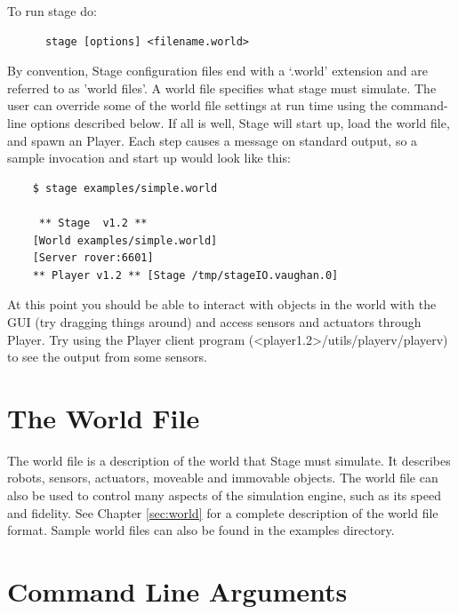 \documentclass[11pt,twoside]{report}
\begin{document}
    To run stage do: 
      \begin{verbatim} 
      stage [options] <filename.world> 
      \end{verbatim} 

    By convention, Stage configuration files end with a `.world'
    extension and are referred to as 'world files'. A world file
    specifies what stage must simulate. The user can override some of
    the world file settings at run time using the command-line options
    described below. If all is well, Stage will start up, load the
    world file, and spawn an Player. Each step causes a message on
    standard output, so a sample invocation and start up would look
    like this:

	\begin{verbatim} 
	$ stage examples/simple.world

	 ** Stage  v1.2 ** 
	[World examples/simple.world]
	[Server rover:6601]
	** Player v1.2 ** [Stage /tmp/stageIO.vaughan.0]
      \end{verbatim}

    At this point you should be able to interact with objects in the
    world with the GUI (try dragging things around) and access sensors
    and actuators through Player. Try using the Player client program
    (<player1.2>/utils/playerv/playerv) to see the output from some
    sensors.

  
  \section{The World File}

    The world file is a description of the world that Stage
    must simulate.  It describes robots, sensors, actuators,
    moveable and immovable objects.  The world file can also
    be used to control many aspects of the simulation engine,
    such as its speed and fidelity.  
    See Chapter \ref{sec:world} for a complete description of
    the world file format.  Sample world files can also be
    found in the examples directory.

  \section{Command Line Arguments}
\end{document}
